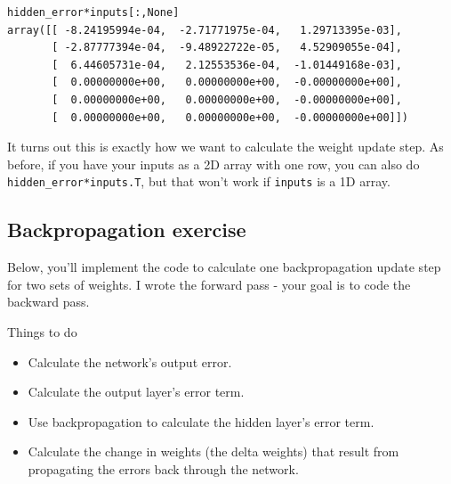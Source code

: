 \begin{lstlisting}
hidden_error*inputs[:,None]
array([[ -8.24195994e-04,  -2.71771975e-04,   1.29713395e-03],
       [ -2.87777394e-04,  -9.48922722e-05,   4.52909055e-04],
       [  6.44605731e-04,   2.12553536e-04,  -1.01449168e-03],
       [  0.00000000e+00,   0.00000000e+00,  -0.00000000e+00],
       [  0.00000000e+00,   0.00000000e+00,  -0.00000000e+00],
       [  0.00000000e+00,   0.00000000e+00,  -0.00000000e+00]])
\end{lstlisting}

It turns out this is exactly how we want to calculate the weight update step. As before, if you have your inputs as a 2D array with one row, you can also do \lstinline{hidden_error*inputs.T}, but that won't work if \lstinline{inputs} is a 1D array.

\subsection{Backpropagation exercise}
Below, you'll implement the code to calculate one backpropagation update step for two sets of weights. I wrote the forward pass - your goal is to code the backward pass.

Things to do

\begin{itemize}
    \item Calculate the network's output error.
    \item Calculate the output layer's error term.
    \item Use backpropagation to calculate the hidden layer's error term.
    \item Calculate the change in weights (the delta weights) that result from propagating the errors back through the network.
\end{itemize}

